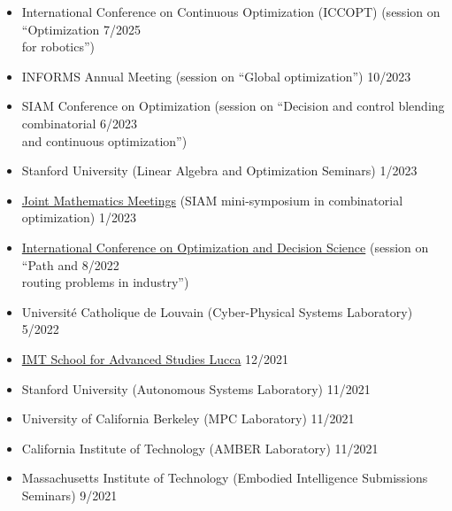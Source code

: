 \documentclass[11pt,a4paper,sans]{moderncv}
\begin{document}
\begin{itemize}
	
\item
International Conference on Continuous Optimization (ICCOPT)  (session on ``Optimization \hfill 7/2025 \\ for robotics'') 
	

\item
INFORMS Annual Meeting (session on ``Global optimization'') \hfill 10/2023

\item
SIAM Conference on Optimization (session on ``Decision and control blending combinatorial \hfill 6/2023 \\ and continuous optimization'')
\item
Stanford University (Linear Algebra and Optimization Seminars) \hfill 1/2023

\item \href{https://www.jointmathematicsmeetings.org/meetings/national/jmm2023/2270_program.html}{\color{cyan}Joint Mathematics Meetings} (SIAM mini-symposium in combinatorial optimization)  \hfill 1/2023

\item \href{http://www.airoconference.it/ods2022/}{\color{cyan}International Conference on Optimization and Decision Science} (session on ``Path and \hfill 8/2022 \\ routing problems in industry'') 


\item Universit\'e Catholique de Louvain (Cyber-Physical Systems Laboratory) \hfill 5/2022

\item \href{https://www.imtlucca.it/en/eventonew/shortest-paths-graphs-of-convex-sets}{\color{cyan}IMT School for Advanced Studies Lucca} \hfill 12/2021

\item Stanford University (Autonomous Systems Laboratory) \hfill 11/2021

\item University of California Berkeley (MPC Laboratory) \hfill 11/2021

\item California Institute of Technology (AMBER Laboratory) \hfill 11/2021

\item Massachusetts Institute of Technology (Embodied Intelligence Submissions Seminars) \hfill 9/2021


\end{itemize}
\end{document}
